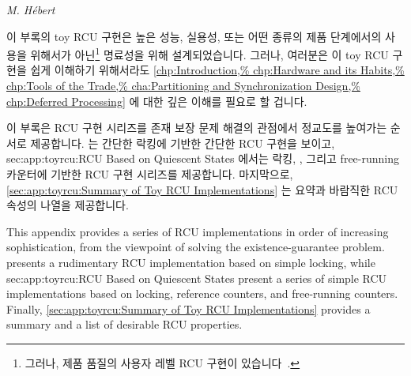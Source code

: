 
%
	 {\emph{M. H\'ebert}}

이 부록의 toy RCU 구현은 높은 성능, 실용성, 또는 어떤 종류의 제품 단계에서의
사용을 위해서가 아닌\footnote{
	그러나, 제품 품질의 사용자 레벨 RCU 구현이
	있습니다~\cite{MathieuDesnoyers2009URCU,MathieuDesnoyers2012URCU}.}
명료성을 위해 설계되었습니다.
그러나, 여러분은 이 toy RCU 구현을 쉽게 이해하기 위해서라도
\cref{chp:Introduction,%
chp:Hardware and its Habits,%
chp:Tools of the Trade,%
cha:Partitioning and Synchronization Design,%
chp:Deferred Processing}
에 대한 깊은 이해를 필요로 할 겁니다.

\iffalse

The toy RCU implementations in this appendix are designed not for
high performance, practicality, or any kind of production use,\footnote{
	However, production-quality user-level RCU implementations
	are available~\cite{MathieuDesnoyers2009URCU,MathieuDesnoyers2012URCU}.}
but rather for clarity.
Nevertheless, you will need a thorough understanding of
\cref{chp:Introduction,%
chp:Hardware and its Habits,%
chp:Tools of the Trade,%
cha:Partitioning and Synchronization Design,%
chp:Deferred Processing}
for even these toy RCU implementations to be easily understandable.

\fi

이 부록은 RCU 구현 시리즈를 존재 보장 문제 해결의 관점에서 정교도를 높여가는
순서로 제공합니다.
 는 간단한 락킹에 기반한 간단한 RCU 구현을
보이고,
{sec:app:toyrcu:RCU Based on Quiescent States}
에서는 락킹,
,
그리고 free-running 카운터에 기반한 RCU 구현 시리즈를 제공합니다.
마지막으로, \cref{sec:app:toyrcu:Summary of Toy RCU Implementations}
는 요약과 바람직한 RCU 속성의 나열을 제공합니다.

\iffalse

This appendix provides a series of RCU implementations in order of
increasing sophistication, from the viewpoint of solving the
existence-guarantee problem.
 presents a rudimentary
RCU implementation based on simple locking, while
{sec:app:toyrcu:RCU Based on Quiescent States}
present a series of
simple RCU implementations based on locking, reference counters,
and free-running counters.
Finally, \cref{sec:app:toyrcu:Summary of Toy RCU Implementations}
provides a summary and a list of desirable RCU properties.


